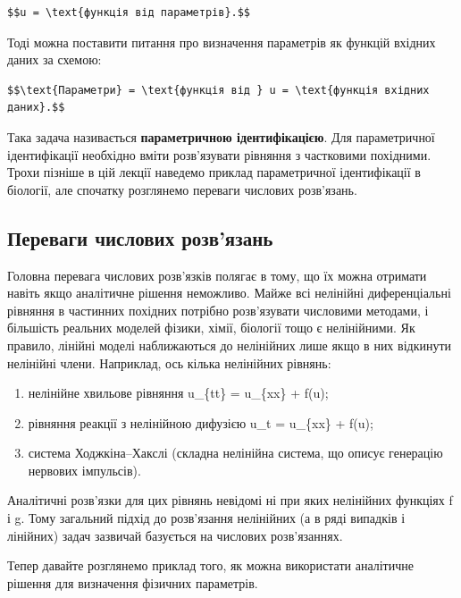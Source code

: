 \documentclass[
  ukrainian,
]{article}
\begin{document}
\begin{verbatim}
$$u = \text{функція від параметрів}.$$
\end{verbatim}

Тоді можна поставити питання про визначення параметрів як функцій
вхідних даних за схемою:

\begin{verbatim}
$$\text{Параметри} = \text{функція від } u = \text{функція вхідних даних}.$$
\end{verbatim}

Така задача називається \textbf{параметричною ідентифікацією}. Для
параметричної ідентифікації необхідно вміти розв'язувати рівняння з
частковими похідними. Трохи пізніше в цій лекції наведемо приклад
параметричної ідентифікації в біології, але спочатку розглянемо переваги
числових розв'язань.

\subsection{Переваги числових
розв'язань}\label{ux43fux435ux440ux435ux432ux430ux433ux438-ux447ux438ux441ux43bux43eux432ux438ux445-ux440ux43eux437ux432ux44fux437ux430ux43dux44c}

Головна перевага числових розв'язків полягає в тому, що їх можна
отримати навіть якщо аналітичне рішення неможливо. Майже всі нелінійні
диференціальні рівняння в частинних похідних потрібно розв'язувати
числовими методами, і більшість реальних моделей фізики, хімії, біології
тощо є нелінійними. Як правило, лінійні моделі наближаються до
нелінійних лише якщо в них відкинути нелінійні члени. Наприклад, ось
кілька нелінійних рівнянь:

\begin{enumerate}
\def\labelenumi{\arabic{enumi}.}
\item
  нелінійне хвильове рівняння u\_\{tt\} = u\_\{xx\} + f(u);
\item
  рівняння реакції з нелінійною дифузією u\_t = u\_\{xx\} + f(u);
\item
  система Ходжкіна--Хакслі (складна нелінійна система, що описує
  генерацію нервових імпульсів).
\end{enumerate}

Аналітичні розв'язки для цих рівнянь невідомі ні при яких нелінійних
функціях f і g. Тому загальний підхід до розв'язання нелінійних (а в
ряді випадків і лінійних) задач зазвичай базується на числових
розв'язаннях.

Тепер давайте розглянемо приклад того, як можна використати аналітичне
рішення для визначення фізичних параметрів.
\end{document}
